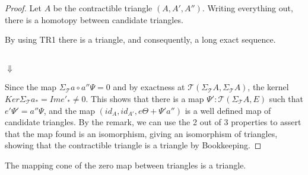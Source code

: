     \begin{proof}
        Let $A$ be the contractible triangle $(A,A',A'')$. Writing everything out, there is a homotopy between candidate triangles.
        \begin{center}
        \end{center}
        By using TR1 there is a triangle, and consequently, a long exact sequence.
        \begin{center}
             \\
            $\Downarrow$ \\
        \end{center}
        Since the map $\Sigma_{\mathcal{T}}a\circ a''\Psi = 0$ and by exactness at $\mathcal{T}(\Sigma_{\mathcal{T}}A,\Sigma_{\mathcal{T}}A)$, the kernel $Ker\Sigma_{\mathcal{T}}a_*=Ime'_*\neq 0$. This shows that there is a map ${\Psi}':\mathcal{T}(\Sigma_{\mathcal{T}}A,E)$ such that $e'{\Psi}'=a''\Psi$, and the map $(id_A,id_{A'},e\Theta+{\Psi}'a'')$ is a well defined map of candidate triangles. By the remark, we can use the 2 out of 3 properties to assert that the map found is an isomorphism, giving an isomorphism of triangles, showing that the contractible triangle is a triangle by Bookkeeping. 
    \end{proof}

    \begin{corollary}
        The mapping cone of the zero map between  triangles is a triangle. 
    \end{corollary}

